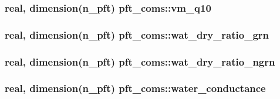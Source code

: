 \subsubsection[{vm\+\_\+q10}]{\setlength{\rightskip}{0pt plus 5cm}real, dimension(n\+\_\+pft) pft\+\_\+coms\+::vm\+\_\+q10}\label{namespacepft__coms_a47018d91ecb1fe0c547ec131348e5fdd}
\hypertarget{namespacepft__coms_a93b820778e953be06816231daa419ca5}{}
\subsubsection[{wat\+\_\+dry\+\_\+ratio\+\_\+grn}]{\setlength{\rightskip}{0pt plus 5cm}real, dimension(n\+\_\+pft) pft\+\_\+coms\+::wat\+\_\+dry\+\_\+ratio\+\_\+grn}\label{namespacepft__coms_a93b820778e953be06816231daa419ca5}
\hypertarget{namespacepft__coms_a4228db82826a9e2afbe3646586c0c4ac}{}
\subsubsection[{wat\+\_\+dry\+\_\+ratio\+\_\+ngrn}]{\setlength{\rightskip}{0pt plus 5cm}real, dimension(n\+\_\+pft) pft\+\_\+coms\+::wat\+\_\+dry\+\_\+ratio\+\_\+ngrn}\label{namespacepft__coms_a4228db82826a9e2afbe3646586c0c4ac}
\hypertarget{namespacepft__coms_a57b4aabb4896e59800ec2159c64d06b3}{}
\subsubsection[{water\+\_\+conductance}]{\setlength{\rightskip}{0pt plus 5cm}real, dimension(n\+\_\+pft) pft\+\_\+coms\+::water\+\_\+conductance}\label{namespacepft__coms_a57b4aabb4896e59800ec2159c64d06b3}
